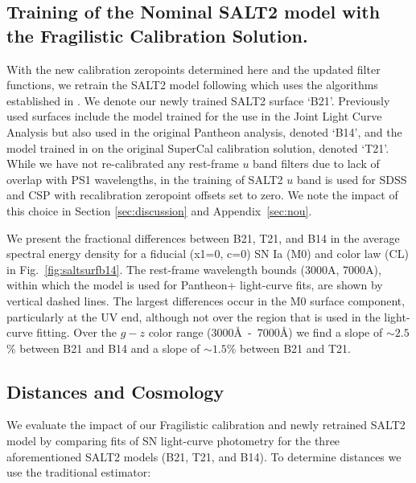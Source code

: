 \documentclass[twocolumn]{aastex63}
\newcommand{\blue}{\color{black}}
\newcommand{\red}{\color{black}}
\begin{document}
\subsection{Training of the Nominal SALT2 model with the Fragilistic Calibration Solution.}


With the new calibration zeropoints determined here and the updated filter functions, we retrain the SALT2 model following \cite{Taylor21} which uses the algorithms established in \cite{Guy2010}.  We denote our newly trained SALT2 surface `B21'. Previously used surfaces include the model trained for the use in the Joint Light Curve Analysis but also used in the original Pantheon analysis, denoted `B14', and the model trained in \cite{Taylor21} on the original SuperCal calibration solution, denoted `T21'.  {\red While we have not re-calibrated any rest-frame $u$ band filters due to lack of overlap with PS1 wavelengths, in the training of SALT2 $u$ band is used for SDSS and CSP with recalibration zeropoint offsets set to zero. We note the impact of this choice in Section \ref{sec:discussion} and Appendix~\ref{sec:nou}.}

We present the fractional differences between B21, T21, and B14 in the average spectral energy density for a fiducial (x1=0, c=0) SN Ia (M0) and color law (CL) in Fig.~\ref{fig:saltsurfb14}. The rest-frame wavelength bounds (3000A, 7000A), within which the model is used for Pantheon+ light-curve fits, are shown by vertical dashed lines. The largest differences occur in the M0 surface component, particularly at the UV end, although not over the region that is used in the light-curve fitting. {\blue Over the $g-z$ color range (3000\AA~-~7000\AA) we find a slope of $\sim2.5$\% between B21 and B14 and a slope of $\sim1.5$\% between B21 and T21.} 





\subsection{Distances and Cosmology}

We evaluate the impact of our Fragilistic calibration and newly retrained SALT2 model by comparing fits of SN light-curve photometry for the three aforementioned SALT2 models (B21, T21, and B14). 
To determine distances we use the traditional \cite{Tripp98} estimator:
\end{document}
